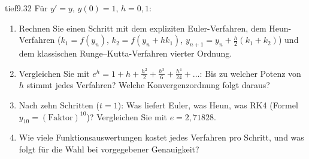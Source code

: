 \begin{karte}{tief}{9.32}{\typtypisch}{}
Für $y' = y$, $y(0) = 1$, $h = 0{,}1$:
\begin{enumerate}[label=(\alph*),leftmargin=1.6em,itemsep=2pt]
\item Rechnen Sie einen Schritt mit dem expliziten Euler-Verfahren, dem Heun-Verfahren ($k_1 = f(y_n)$, $k_2 = f(y_n + hk_1)$, $y_{n+1} = y_n + \frac h2(k_1 + k_2)$) und dem klassischen Runge--Kutta-Verfahren vierter Ordnung.
\item Vergleichen Sie mit $e^{h} = 1 + h + \frac{h^{2}}2 + \frac{h^{3}}6 + \frac{h^{4}}{24} + \dots$: Bis zu welcher Potenz von $h$ stimmt jedes Verfahren? Welche Konvergenzordnung folgt daraus?
\item Nach zehn Schritten ($t = 1$): Was liefert Euler, was Heun, was RK4 (Formel $y_{10} = (\text{Faktor})^{10}$)? Vergleichen Sie mit $e = 2{,}71828$.
\item Wie viele Funktionsauswertungen kostet jedes Verfahren pro Schritt, und was folgt für die Wahl bei vorgegebener Genauigkeit?
\end{enumerate}
\end{karte}
